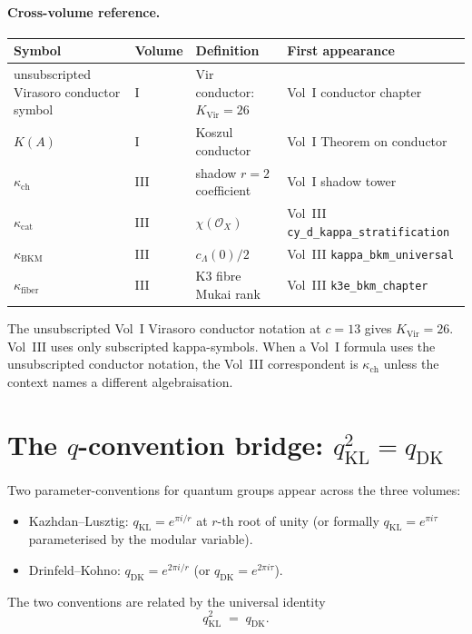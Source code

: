\paragraph{Cross-volume reference.}
\begin{tabular}{l|l|l|l}
Symbol & Volume & Definition & First appearance \\ \hline
unsubscripted Virasoro conductor symbol & I & Vir conductor: $K_{\mathrm{Vir}} = 26$ & Vol~I conductor chapter \\
$K(A)$ & I & Koszul conductor & Vol~I Theorem on conductor \\
$\kappa_{\mathrm{ch}}$ & III & shadow $r=2$ coefficient & Vol~I shadow tower \\
$\kappa_{\mathrm{cat}}$ & III & $\chi(\mathcal{O}_X)$ & Vol~III \texttt{cy\_d\_kappa\_stratification} \\
$\kappa_{\mathrm{BKM}}$ & III & $c_{\Lambda}(0)/2$ & Vol~III \texttt{kappa\_bkm\_universal} \\
$\kappa_{\mathrm{fiber}}$ & III & K3 fibre Mukai rank & Vol~III \texttt{k3e\_bkm\_chapter} \\
\end{tabular}

The unsubscripted Vol~I Virasoro conductor notation at $c = 13$ gives
$K_{\mathrm{Vir}} = 26$. Vol~III uses only subscripted kappa-symbols.
When a Vol~I formula uses the unsubscripted conductor notation, the
Vol~III correspondent is $\kappa_{\mathrm{ch}}$ unless the
context names a different algebraisation.


\section{The \texorpdfstring{$q$}{q}-convention bridge: \texorpdfstring{$q_{\mathrm{KL}}^2 = q_{\mathrm{DK}}$}{q-KL-2 = q-DK}}
\label{sec:q-convention-bridge}

Two parameter-conventions for quantum groups appear across the three
volumes:
\begin{itemize}
 \item Kazhdan--Lusztig: $q_{\mathrm{KL}} = e^{\pi i / r}$ at $r$-th root of
 unity \textup{(}or formally $q_{\mathrm{KL}} = e^{\pi i \tau}$
 parameterised by the modular variable\textup{).}
 \item Drinfeld--Kohno: $q_{\mathrm{DK}} = e^{2 \pi i / r}$ \textup{(}or
 $q_{\mathrm{DK}} = e^{2 \pi i \tau}$\textup{).}
\end{itemize}

The two conventions are related by the universal identity
\[
 \boxed{\;q_{\mathrm{KL}}^2 \;=\; q_{\mathrm{DK}}.\;}
\]

